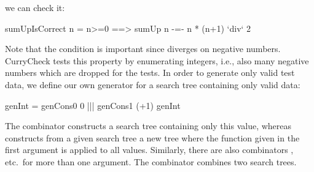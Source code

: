 we can check it:
%
\begin{curry}
sumUpIsCorrect n = n>=0 ==> sumUp n -=- n * (n+1) `div` 2
\end{curry}
Note that the condition is important since 
diverges on negative numbers.
CurryCheck tests this property by enumerating integers,
i.e., also many negative numbers which are dropped for the tests.
In order to generate only valid test data, we define
our own generator for a search tree containing only valid data:
%
\begin{curry}
genInt = genCons0 0 ||| genCons1 (+1) genInt
\end{curry}
%
The combinator  constructs a search tree
containing only this value, whereas 
constructs from a given search tree a new tree where the function
given in the first argument is applied to all values.
Similarly, there are also combinators ,
 etc.\ for more than one argument.
The combinator \ccode{|||} combines two search trees.


